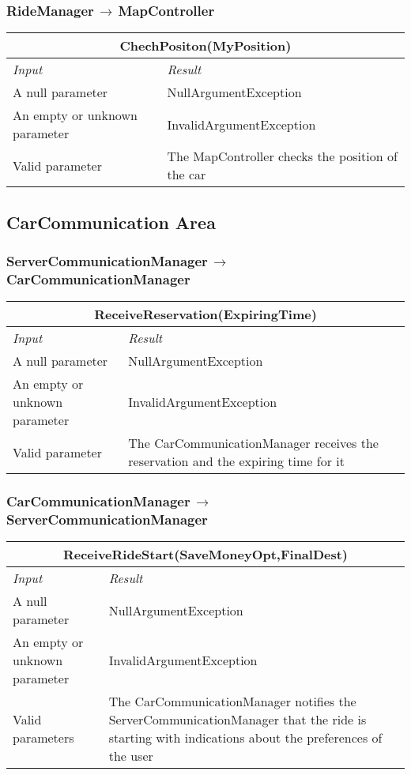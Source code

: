 \documentclass[11pt,a4paper]{report}
\begin{document}
\subsubsection{RideManager$\,\to\,$MapController}
\begin{tabularx}{\textwidth}{|X|X|}
	\hline
	\multicolumn{2}{|c|}{\textbf{ChechPositon(MyPosition)}}\\
	\hline
	\textit{Input} & \textit{Result}\\
	\hline
	A null parameter & NullArgumentException\\
	\hline
	An empty or unknown parameter & InvalidArgumentException\\
	\hline
	Valid parameter &  The MapController checks the position of the car\\
	\hline
\end{tabularx}
\subsection{CarCommunication Area}
\subsubsection{ServerCommunicationManager$\,\to\,$CarCommunicationManager}
\begin{tabularx}{\textwidth}{|X|X|}
	\hline
	\multicolumn{2}{|c|}{\textbf{ReceiveReservation(ExpiringTime)}}\\
	\hline
	\textit{Input} & \textit{Result}\\
	\hline
	A null parameter & NullArgumentException\\
	\hline
	An empty or unknown parameter & InvalidArgumentException\\
	\hline
	Valid parameter &  The CarCommunicationManager receives the reservation and the expiring time for it\\
	\hline
\end{tabularx}
\subsubsection{CarCommunicationManager$\,\to\,$ServerCommunicationManager}
\begin{tabularx}{\textwidth}{|X|X|}
	\hline
	\multicolumn{2}{|c|}{\textbf{ReceiveRideStart(SaveMoneyOpt,FinalDest)}}\\
	\hline
	\textit{Input} & \textit{Result}\\
	\hline
	A null parameter & NullArgumentException\\
	\hline
	An empty or unknown parameter & InvalidArgumentException\\
	\hline
	Valid parameters &  The CarCommunicationManager notifies the ServerCommunicationManager that the ride is starting with indications about the preferences of the user\\
	\hline
\end{tabularx}
\end{document}
